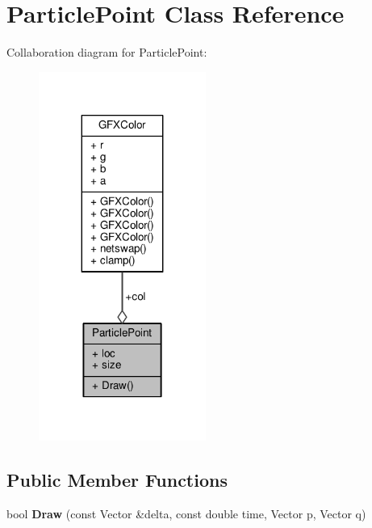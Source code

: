 \hypertarget{classParticlePoint}{}\section{Particle\+Point Class Reference}
\label{classParticlePoint}


Collaboration diagram for Particle\+Point\+:
\nopagebreak
\begin{figure}[H]
\begin{center}
\leavevmode
\includegraphics[width=155pt]{d1/d05/classParticlePoint__coll__graph}
\end{center}
\end{figure}
\subsection*{Public Member Functions}
\begin{DoxyCompactItemize}
\item 
bool {\bfseries Draw} (const Vector \&delta, const double time, Vector p, Vector q)\hypertarget{classParticlePoint_a70f25968b9e222cbdc0c7214645db714}{}\label{classParticlePoint_a70f25968b9e222cbdc0c7214645db714}

\end{DoxyCompactItemize}
